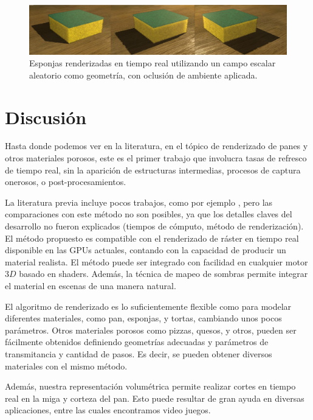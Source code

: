 \begin{figure}
  \centerline{\includegraphics[width=13cm]{figures/sponges}}
  \caption{Esponjas renderizadas en tiempo real utilizando un campo escalar aleatorio como geometría, con oclusión de ambiente aplicada.}
  \label{fg:sponges}
\end{figure}

\section{Discusión}


Hasta donde podemos ver en la literatura, en el tópico de renderizado de panes y otros materiales porosos, este es el primer trabajo que involucra tasas de refresco de tiempo real, sin la aparición de estructuras intermedias, procesos de captura onerosos, o post-procesamientos.

La literatura previa incluye pocos trabajos, como por ejemplo \cite{Cho2007}, pero las comparaciones con este método no son posibles, ya que los detalles claves del desarrollo no fueron explicados (tiempos de cómputo, método de renderización).
El método propuesto es compatible con el renderizado de ráster en tiempo real disponible en las GPUs actuales, contando con la capacidad de producir un material realista.
El método puede ser integrado con facilidad en cualquier motor $3D$ basado en shaders.
Además, la técnica de mapeo de sombras permite integrar el material en escenas de una manera natural.


El algoritmo de renderizado es lo suficientemente flexible como para modelar diferentes materiales, como pan, esponjas, y tortas, cambiando unos pocos parámetros.
Otros materiales porosos como pizzas, quesos, y otros, pueden ser fácilmente obtenidos definiendo geometrías adecuadas y parámetros de transmitancia y cantidad de pasos.
Es decir, se pueden obtener diversos materiales con el mismo método.

Además, nuestra representación volumétrica permite realizar cortes en tiempo real en la miga y corteza del pan.
Esto puede resultar de gran ayuda en diversas aplicaciones, entre las cuales encontramos video juegos.

